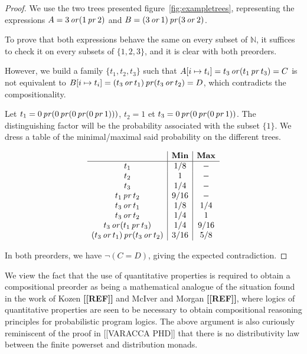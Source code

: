 \begin{proof}
    We use the two trees presented figure~\ref{fig:exampletrees},
    representing the expressions $A = 3 \operatorname{\mathit{or}} (1 \operatorname{\mathit{pr}} 2)$
    and $B = (3 \operatorname{\mathit{or}} 1) \operatorname{\mathit{pr}} (3 \operatorname{\mathit{or}} 2)$.

    To prove that both expressions behave the same on every subset of $\mathbb{N}$,
    it suffices to check it on every subsets of $\{ 1, 2, 3\}$, and it is clear
    with both preorders.

    However, we build a family $\{ t_1, t_2, t_3\}$ such that 
    $A[ i \mapsto t_i] = t_3 \operatorname{\mathit{or}} (t_1 \operatorname{\mathit{pr}} t_3) = C$ is not equivalent to 
    $B[ i\mapsto t_i] = (t_3 \operatorname{\mathit{or}} t_1) \operatorname{\mathit{pr}} (t_3 \operatorname{\mathit{or}} t_2) = D$,
    which contradicts the compositionality.

    Let $t_1 = 0 \operatorname{\mathit{pr}} (0 \operatorname{\mathit{pr}} (0 \operatorname{\mathit{pr}} (0 \operatorname{\mathit{pr}} 1)))$,
    $t_2 = 1$ et $t_3 = 0 \operatorname{\mathit{pr}} (0 \operatorname{\mathit{pr}} (0 \operatorname{\mathit{pr}} 1))$. The distinguishing 
    factor will be the probability associated with the subset $\{ 1 \}$.
    We dress a table of the minimal/maximal said probability on the different 
    trees.
    
    \begin{equation*}
        \begin{array}{c|c|c}
                & \textbf{Min} & \textbf{Max} \\ \hline
            t_1 & 1/8 & - \\
            t_2 & 1   & -   \\
            t_3 & 1/4 & - \\
            t_1 \operatorname{\mathit{pr}} t_2 & 9 / 16 & - \\
            t_3 \operatorname{\mathit{or}} t_1 & 1/8    & 1/4 \\
            t_3 \operatorname{\mathit{or}} t_2 & 1/4    & 1   \\
            t_3 \operatorname{\mathit{or}} (t_1 \operatorname{\mathit{pr}} t_3) & 1/4 & 9/16 \\
            (t_3 \operatorname{\mathit{or}} t_1) \operatorname{\mathit{pr}} (t_3 \operatorname{\mathit{or}} t_2) & 3 / 16 & 5/8 \\
        \end{array}
    \end{equation*}

    In both preorders, we have $\neg (C = D)$,
    giving the expected contradiction.
\end{proof}



We view the fact that the use of quantitative properties is required to obtain a compositional preorder as being
a mathematical analogue of the situation found in the work of Kozen
\textbf{[[REF]]} and McIver and Morgan \textbf{[[REF]]}, where 
logics of quantitative properties are seen to be necessary to obtain compositional reasoning principles for 
probabilistic program logics. The above argument is also curiously  reminiscent of the proof in [[VARACCA PHD]]
that there is no distributivity law between the finite powerset and distribution monads.


